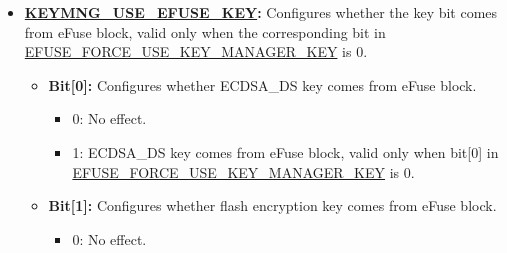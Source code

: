 \documentclass[main\_\_EN.tex]{subfiles}
\begin{document}
\begin{enumerate}
\begin{itemize}
\begin{itemize}
\begin{itemize}
                    \item 0: HMAC key does not have to come from the Key Manager.
                    \item 1: HMAC key must come from the Key Manager.
                \end{itemize}
            \item \textbf{Bit[3]}: Configures whether RSA Digital Signature Peripheral (RSA\_DS) key must come from the Key Manager.
                \begin{itemize}
                    \item 0: RSA\_DS key does not have to come from the Key Manager.
                    \item 1: RSA\_DS key must come from the Key Manager.
                \end{itemize}
            \item \textbf{Bit[4]}: Configures whether PSRAM key must come from the Key Manager.
                \begin{itemize}
                    \item 0: PSRAM key does not have to come from the Key Manager.
                    \item 1: PSRAM key must come from the Key Manager.
                \end{itemize}
        \end{itemize}
        \item \textbf{\hyperref[fielddesc:KEYMNGUSEEFUSEKEY]{KEYMNG\_USE\_EFUSE\_KEY}:} Configures whether the key bit comes from eFuse block, valid only when the corresponding bit in \hyperref[fielddesc:EFUSEFORCEUSEKEYMANAGERKEY]{EFUSE\_FORCE\_USE\_KEY\_MANAGER\_KEY} is 0.
        \begin{itemize}
            \item \textbf{Bit[0]:} Configures whether ECDSA\_DS key comes from eFuse block.
                \begin{itemize}
                    \item 0: No effect.
                    \item 1: ECDSA\_DS key comes from eFuse block, valid only when bit[0] in \hyperref[fielddesc:EFUSEFORCEUSEKEYMANAGERKEY]{EFUSE\_FORCE\_USE\_KEY\_MANAGER\_KEY} is 0.
                \end{itemize}
            \item \textbf{Bit[1]:} Configures whether flash encryption key comes from eFuse block.
                \begin{itemize}
                    \item 0: No effect.

\end{itemize}
\end{itemize}
\end{itemize}
\end{enumerate}
\end{document}
